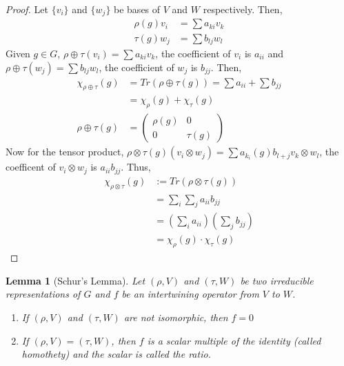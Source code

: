 \documentclass[letterpaper, leqno, 12pt]{article}
\newcommand {\repV} {(\rho,V)}
\newcommand {\repW} {(\tau,W)}
\newcommand{\tmatrix}[4]{\left(  \begin{array}{cc}
#1 & #2 \\ 
#3 & #4
\end{array} \right) }
\theoremstyle{stdthm}
\newtheorem{lem}[thm]{Lemma}
\theoremstyle{stddef}
\theoremstyle{stdnonum}
\theoremstyle{stdqands}
\theoremstyle{stdbold}
\begin{document}
\begin{proof}
Let $\{v_i\}$ and $\{w_j\}$ be bases of $V$ and $W$ respectively. Then,
\begin{align*}
\rho(g) v_i &= \sum{a_{ki} v_k}\\
\tau(g) w_j &= \sum {b_{lj}} w_l
\end{align*}
Given $g \in G$,  $\rho \oplus \tau (v_i) = \sum {a_{ki} v_k}$, the coefficient of $v_i$ is $a_{ii}$ and $\rho \oplus \tau (w_j) = \sum{b_{lj}w_l}$, the coefficient of $w_j$ is $b_{jj}$.  Then,
\begin{align*}
\chi_{\rho \oplus \tau} (g) &= Tr(\rho \oplus \tau(g)) = \sum a_{ii} + \sum b_{jj} \\
&= \chi_\rho(g) + \chi_\tau(g)\\
\rho \oplus \tau(g) &= \tmatrix{\rho(g)}{0}{0}{\tau(g)}
\end{align*}
Now for the tensor product, $\rho \otimes \tau(g) (v_i \otimes w_j) = \sum a_{k_i}(g) b_{l+j} v_k \otimes w_l$, the coefficent of $v_i \otimes w_j$ is $a_{ii}b_{jj}$. Thus, 
\begin{align*}
\chi_{\rho \otimes \tau} (g) &:= Tr (\rho \otimes \tau(g))\\
&= \sum_{i} \sum_{j} a_{ii}b_{jj}\\
&= \left( \sum_{i} a_{ii} \right) \left(\sum_j b_{jj} \right)\\
&= \chi_\rho(g) \cdot \chi_\tau(g)
\end{align*}
\end{proof}

\begin{lem} [Schur's Lemma]
Let $\repV$ and $\repW$ be two irreducible representations of $G$ and $f$ be an intertwining operator from $V$ to $W$. 
\begin{enumerate}
\item If $\repV$ and $\repW$ are not isomorphic, then $f = 0$
\item If $\repV = \repW$, then $f$ is a scalar multiple of the identity (called homothety) and the scalar is called the ratio.  
\end{enumerate}
\end{lem}
\end{document}
